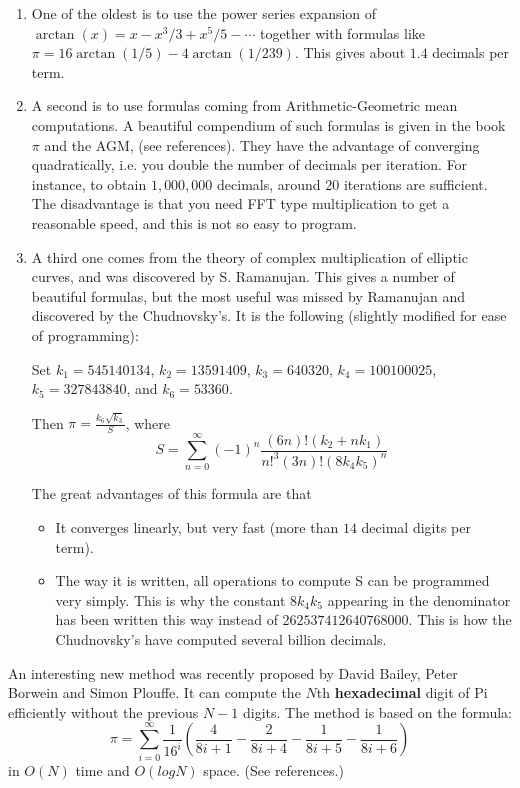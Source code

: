 \begin{enumerate}
  \item One of the oldest is to use the power series expansion of
  $\arctan(x)=x - x^3/3 + x^5/5 - \cdots$ together with formulas like
  $\pi=16\arctan(1/5)-4\arctan(1/239)$. This gives about $1.4$ decimals
  per term.

  \item A second is to use formulas coming from Arithmetic-Geometric
  mean computations. A beautiful compendium of such formulas is given in
  the book $\pi$ and the AGM, (see references).  They have the advantage
  of converging quadratically, i.e. you double the number of decimals
  per iteration.  For instance, to obtain $1,000,000$ decimals, around
  $20$ iterations are sufficient. The disadvantage is that you need FFT
  type multiplication to get a reasonable speed, and this is not so easy
  to program.

  \item A third one comes from the theory of complex multiplication of
  elliptic curves, and was discovered by S. Ramanujan. This gives a
  number of beautiful formulas, but the most useful was missed by
  Ramanujan and discovered by the Chudnovsky's. It is the following
  (slightly modified for ease of programming):

  Set $k_1 = 545140134$, $k_2 = 13591409$, $k_3 = 640320$, $k_4 =
  100100025$, $k_5 = 327843840$, and $k_6 = 53360$.

  Then $\pi = \frac{k_6 \sqrt{k_3}}{S}$, where
  \[
  S = \sum_{n=0}^\infty (-1)^n\frac{(6n)!(k_2+nk_1)}{n!^3(3n)!(8k_4k_5)^n}
  \]

  The great advantages of this formula are that

  \begin{itemize}
    \item It converges linearly, but very fast (more than $14$ decimal
    digits per term).

    \item The way it is written, all operations to compute S can be
    programmed very simply. This is why the constant $8k_4k_5$ appearing
    in the denominator has been written this way instead of
    $262537412640768000$.  This is how the Chudnovsky's have computed
    several billion decimals.
  \end{itemize}
\end{enumerate}

An interesting new method was recently proposed by David Bailey, Peter
Borwein and Simon Plouffe. It can compute the $N$th {\bf hexadecimal}
digit of Pi efficiently without the previous $N-1$ digits. The method is
based on the formula:
\[
  \pi = \sum_{i=0}^\infty \frac{1}{16^i}
  \left(
    \frac{4}{8i+1} - \frac{2}{8i+4} - \frac{1}{8i+5} - \frac{1}{8i+6}
  \right)
\]
in $O(N)$ time and $O(log N)$ space. (See references.)

